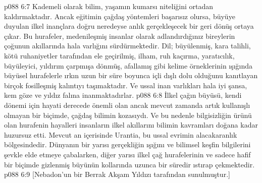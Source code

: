 \vs p088 6:7 Kademeli olarak bilim, yaşamın kumarsı niteliğini ortadan kaldırmaktadır. Ancak eğitimin çağdaş yöntemleri başarısız olursa, büyüye duyulan ilkel inançlara doğru neredeyse anlık gerçekleşecek bir geri dönüş ortaya çıkar. Bu hurafeler, medenileşmiş insanlar olarak adlandırdığınız bireylerin çoğunun akıllarında hala varlığını sürdürmektedir. Dil; büyülenmiş, kara talihli, kötü ruhaniyetler tarafından ele geçirilmiş, ilham, ruh kaçırma, yaratıcılık, büyüleyici, yıldırım çarpmışa dönmüş, afallamış gibi kelime örneklerinin ışığında büyüsel hurafelerle ırkın uzun bir süre boyunca içli dışlı dolu olduğunu kanıtlayan birçok fosilleşmiş kalıntıyı taşımaktadır. Ve ussal inan varlıkları hala iyi şansa, kem göze ve yıldız falına inanmaktadırlar.
\vs p088 6:8 İlkel çağın büyüsü, kendi dönemi için hayati derecede önemli olan ancak mevcut zamanda artık kullanışlı olmayan bir biçimde, çağdaş bilimin kozasıydı. Ve bu nedenle bilgisizliğin ürünü olan hurafenin hayalleri insanların ilkel akıllarını bilimin kavramları doğana kadar huzursuz etti. Mevcut an içerisinde Urantia, bu ussal evrimin alacakaranlık bölgesindedir. Dünyanın bir yarısı gerçekliğin ışığını ve bilimsel keşfin bilgilerini şevkle elde etmeye çabalarken, diğer yarısı ilkel çağ hurafelerinin ve sadece hafif bir biçimde gizlenmiş büyünün kollarında uzunca bir süredir ıstırap çekmektedir.
\vs p088 6:9 [Nebadon’un bir Berrak Akşam Yıldızı tarafından sunulmuştur.]
